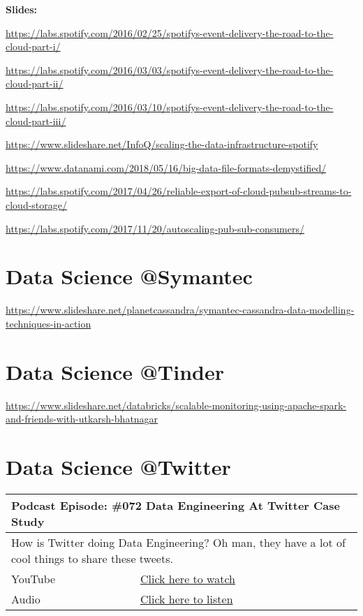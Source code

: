 \documentclass[12pt, numbers=noenddot]{scrreprt} %
\begin{document}
\textbf{Slides:}

\url{https://labs.spotify.com/2016/02/25/spotifys-event-delivery-the-road-to-the-cloud-part-i/}

\url{https://labs.spotify.com/2016/03/03/spotifys-event-delivery-the-road-to-the-cloud-part-ii/}

\url{https://labs.spotify.com/2016/03/10/spotifys-event-delivery-the-road-to-the-cloud-part-iii/}

\url{https://www.slideshare.net/InfoQ/scaling-the-data-infrastructure-spotify}

\url{https://www.datanami.com/2018/05/16/big-data-file-formats-demystified/}

\url{https://labs.spotify.com/2017/04/26/reliable-export-of-cloud-pubsub-streams-to-cloud-storage/}

\url{https://labs.spotify.com/2017/11/20/autoscaling-pub-sub-consumers/}



\section{Data Science @Symantec}
\url{https://www.slideshare.net/planetcassandra/symantec-cassandra-data-modelling-techniques-in-action}

\section{Data Science @Tinder}
\url{https://www.slideshare.net/databricks/scalable-monitoring-using-apache-spark-and-friends-with-utkarsh-bhatnagar}

\section{Data Science @Twitter}

\begin{table}[h]
\begin{tabular}{ll}
\hline
\multicolumn{2}{l}{\textbf{Podcast Episode:} \#072 Data Engineering At Twitter Case Study} \\ \hline
\multicolumn{2}{p{15cm}}{How is Twitter doing Data Engineering? Oh man, they have a lot of cool things to share these tweets. }         \\ \hline
\multicolumn{1}{l|}{YouTube}   & \href{https://youtu.be/UkqSR3IeLZ8}{Click here to watch}   \\ 
\multicolumn{1}{l|}{Audio}     & \href{https://anchor.fm/andreaskayy/episodes/072-Data-Engineering-At-Twitter-Case-Study-e45iqq}{Click here to listen}   \\ \hline
\end{tabular}
 \label{tbl:twittercasestudy}
\end{table}
\end{document}
